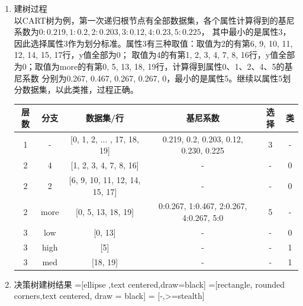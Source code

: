 \documentclass[UTF8,a4paper,12pt]{article}
\begin{document}
\begin{enumerate}[itemindent=0.5em,label=\arabic*、]
\newpage
  \item 建树过程\\
  以CART树为例，第一次递归根节点有全部数据集，各个属性计算得到的基尼系数为$0:0.219, 1:0.2, 2:0.203, 3:0.12, 4:0.23, 5:0.225$，
  其中最小的是属性3，因此选择属性3作为划分标准。属性3有三种取值：取值为2的有第6, 9, 10, 11, 12, 14, 15, 17行，y值全部为0；
  取值为4的有第1, 2, 3, 4, 7, 8, 16行，y值全部为0；取值为more的有第0, 5, 13, 18, 19行，计算得到属性0、1、2、4、5的基尼系数
  分别为0.267, 0.467, 0.267, 0.267, 0，最小的是属性5。继续以属性5划分数据集，以此类推，过程正确。
  \begin{center}
    \begin{tabular}{c|c|c|c|c|c}
    \hline
    层数 & 分支 & 数据集/行 & 基尼系数 & 选择 & 类\\
    \hline
    1	& - & [0, 1, 2, ... , 17, 18, 19] & 0.219, 0.2, 0.203, 0.12, 0.230, 0.225 & 3 & -\\
    2	& 4 & [1, 2, 3, 4, 7, 8, 16] & - & - & 0\\
    2	& 2 & [6, 9, 10, 11, 12, 14, 15, 17] & - & - & 0\\
    2	& more & [0, 5, 13, 18, 19] & 0:0.267, 1:0.467, 2:0.267, 4:0.267, 5:0 & 5 & -\\
    3	& low & [0, 13] & - & - & 0\\
    3	& high & [5] & - & - & 1\\
    3	& med & [18, 19] & - & - & 1\\
    \hline
    \end{tabular}
  \end{center}

  \item 决策树建树结果
  \thispagestyle{empty}
  =[ellipse ,text centered,draw=black]
   =[rectangle, rounded corners,text centered, draw = black]
   = [-,>=stealth]

  \begin{center}
  \end{center}


\end{enumerate}
\end{document}
